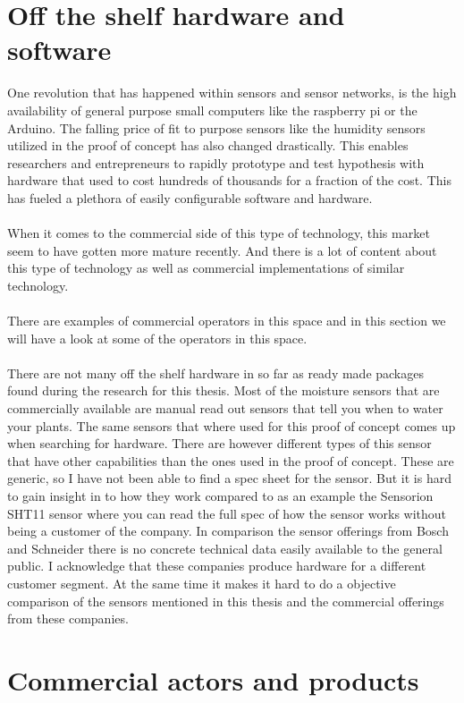 \documentclass[]{uiophd}
\begin{document}
\section{Off the shelf hardware and software}
One revolution that has happened within sensors and sensor networks, is the high availability of general purpose small computers like the raspberry pi or the Arduino. The falling price of fit to purpose sensors like the humidity sensors utilized in the proof of concept has also changed drastically. This enables researchers and entrepreneurs to rapidly prototype and test hypothesis with hardware that used to cost hundreds of thousands for a fraction of the cost. This has fueled a plethora of easily configurable software and hardware.
\\\\
When it comes to the commercial side of this type of technology, this market seem to have gotten more mature recently. And there is a lot of content about this type of technology as well as commercial implementations of similar technology.
\\\\
There are examples of commercial operators in this space and in this section we will have a look at some of the operators in this space.
\\\\
There are not many off the shelf hardware in so far as ready made packages  found during the research for this thesis. Most of the moisture sensors that are commercially available are manual read out sensors that tell you when to water your plants. The same sensors that where used for this proof of concept comes up when searching for hardware. There are however different types of this sensor that have other capabilities than the ones used in the proof of concept. These are generic, so I have not been able to find a spec sheet for the sensor. But it is hard to gain insight in to how they work compared to as an example the Sensorion SHT11 sensor \cite{sensorion} where you can read the full spec of how the sensor works without being a customer of the company. In comparison the sensor offerings from Bosch and Schneider there is no concrete technical data easily available to the general public. I acknowledge that these companies produce hardware for a different customer segment. At the same time it makes it hard to do a objective comparison of the sensors mentioned in this thesis and the commercial offerings from these companies.

\section{Commercial actors and products}
\end{document}

